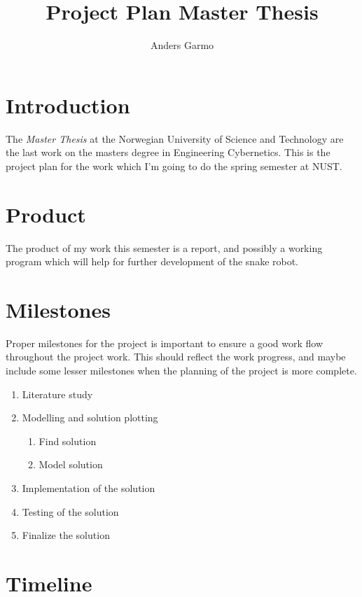 \documentclass[a4paper, 10pt]{article}
\title{Project Plan Master Thesis}
\author{Anders Garmo}
\begin{document}
\maketitle


\section{Introduction}
The \emph{Master Thesis} at the Norwegian University of Science and Technology are the
last work on the masters degree in Engineering Cybernetics. This is the project plan for
the work which I'm going to do the spring semester at NUST. 

\section{Product}
The product of my work this semester is a report, and possibly a working program which
will help for further development of the snake robot. 


\section{Milestones}
Proper milestones for the project is important to ensure a good work flow throughout the
project work. This should reflect the work progress, and maybe include some lesser
milestones when the planning of the project is more complete.

\begin{enumerate}
    \item Literature study
    \item Modelling and solution plotting
        \begin{enumerate}
            \item Find solution
            \item Model solution
        \end{enumerate}
    \item Implementation of the solution
    \item Testing of the solution
    \item Finalize the solution
\end{enumerate}



\section{Timeline}
\end{document}
